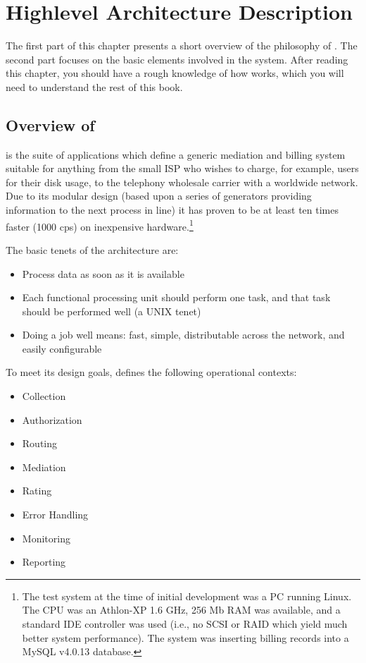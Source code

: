 \chapter{Highlevel Architecture Description}

\begin{intro}
The first part of this chapter presents a short overview
of the philosophy of \XCDR{}. The second part
focuses on the basic elements involved in the \XCDR{} system.
After reading this chapter, you should have a rough knowledge
of how \XCDR{} works, which you will need to understand the rest
of this book.
\end{intro}

\section{Overview of \XCDR{}}

	\XCDR{} is the suite of applications which define a generic mediation and
	billing system suitable for anything from the small ISP who wishes to charge,
	for example, users for their disk usage, to the telephony wholesale carrier
	with a worldwide network. Due to its modular design (based upon a series of
	generators providing information to the next process in line) it has proven
	to be at least ten times faster (1000 cps) on inexpensive
	hardware.\footnote{The test system at the time of initial development was a
		PC running Linux. The CPU was an Athlon-XP 1.6 GHz, 256 Mb RAM
		was available, and a standard IDE controller was used (i.e., no
		SCSI or RAID which yield much better system performance). The
		system was inserting billing records into a MySQL v4.0.13
		database.}

	The basic tenets of the \XCDR{} architecture are:

	\begin{itemize}
	  \item Process data as soon as it is available
	  \item Each functional processing unit should perform one task, and that task should be performed well (a UNIX tenet)
	  \item Doing a job well means: fast, simple, distributable across the network, and easily configurable
	\end{itemize}

	To meet its design goals, \XCDR{} defines the following operational contexts:

	\begin{itemize}
	  \item Collection
	  \item Authorization
	  \item Routing
	  \item Mediation
	  \item Rating
	  \item Error Handling
	  \item Monitoring
	  \item Reporting
	\end{itemize}

